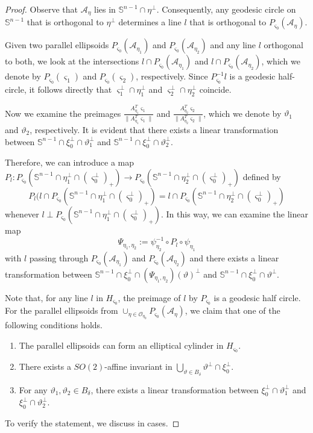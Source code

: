 \documentclass[amsfonts,reqno,11pt]{amsart}
\newcommand{\sphere}{\mathbb{S}^{n-1}}
\begin{document}
\begin{proof}
    Observe that $\mathcal{A}_\eta$ lies in $\sphere \cap \eta^\perp$. Consequently, any geodesic circle on $\sphere$ that is orthogonal to $\eta^\perp$ determines a line $l$ that is orthogonal to $P_{\varsigma_0}(\mathcal{A}_\eta)$.
    
    Given two parallel ellipsoids $P_{\varsigma_0}(\mathcal{A}_{\eta_1})$ and $P_{\varsigma_0}(\mathcal{A}_{\eta_2})$ and any line $l$ orthogonal to both, we look at the intersections $l\cap P_{\varsigma_0}(\mathcal{A}_{\eta_1})$ and $l\cap P_{\varsigma_0}(\mathcal{A}_{\eta_2})$, which we denote by $P_{\varsigma_0}(\varsigma_1)$ and $P_{\varsigma_0}(\varsigma_2)$, respectively. Since $P_{\varsigma_0}^{-1}l$ is a geodesic half-circle, it follows directly that $\varsigma_1^\perp\cap \eta_1^\perp$ and $\varsigma_2^\perp\cap \eta_2^\perp$ coincide.

    Now we examine the preimages $\frac{A_{\eta_1}^T\varsigma_1}{\|A_{\eta_1}^T\varsigma_1\|}$ and $\frac{A_{\eta_2}^T\varsigma_2}{\|A_{\eta_2}^T\varsigma_2\|}$, which we denote by $\vartheta_1$ and $\vartheta_2$, respectively. It is evident that there exists a linear transformation between $\sphere\cap \xi_0^\perp\cap \vartheta_1^\perp$ and $\sphere\cap \xi_0^\perp\cap \vartheta_2^\perp$.

Therefore, we can introduce a map $P_l:P_{\varsigma_0}(\sphere\cap\eta_1^\perp\cap(\varsigma_0^\perp)_+)\to P_{\varsigma_0}(\sphere\cap\eta_2^\perp\cap(\varsigma_0^\perp)_+)$ defined by
$$
P_l(l\cap P_{\varsigma_0}(\sphere\cap\eta_1^\perp\cap(\varsigma_0^\perp)_+) = l\cap P_{\varsigma_0}(\sphere\cap\eta_2^\perp\cap(\varsigma_0^\perp)_+)
$$
whenever $l\perp P_{\varsigma_0}(\sphere\cap\eta_1^\perp\cap(\varsigma_0^\perp)_+)$.
In this way, we can examine the linear map 
$$
\Psi_{\eta_1,\eta_2}:=\psi^{-1}_{\eta_2}\circ P_l\circ \psi_{\eta_1}
$$
with $l$ passing through $ P_{\varsigma_0}(\mathcal{A}_{\eta_1})$ and $ P_{\varsigma_0}(\mathcal{A}_{\eta_2})$ and there exists a linear transformation between $\sphere\cap \xi_0^\perp\cap (\Psi_{\eta_1,\eta_2})(\vartheta)^\perp$ and $\sphere\cap \xi_0^\perp\cap \vartheta^\perp$.

    Note that, for any line $l$ in $H_{\varsigma_0}$, the preimage of $l$ by $P_{\varsigma_0}$ is a geodesic half circle. For the parallel ellipsoids from $\cup_{\eta\in \mathcal{O}_{\eta_0}}P_{\varsigma_0}(\mathcal{A}_\eta)$, we claim that one of the following conditions holds.
    \begin{enumerate}
        \item The parallel ellipsoids can form an elliptical cylinder in $H_{\varsigma_0}$.
        \item There exists a $SO(2)$-affine invariant in $\bigcup_{\vartheta\in B_\delta}\vartheta^\perp\cap\xi_0^\perp$.
        \item For any $\vartheta_1, \vartheta_2\in B_\delta$, there exists a linear transformation between $\xi_0^\perp\cap\vartheta_1^\perp$ and $\xi_0^\perp\cap\vartheta_2^\perp$.
    \end{enumerate}
   To verify the statement, we discuss in cases.


\end{proof}
\end{document}
